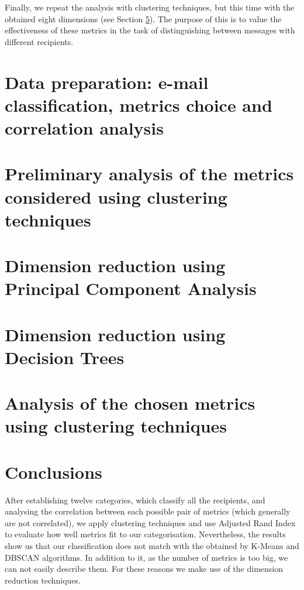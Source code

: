Finally, we repeat the analysis with clustering techniques, but this time with the obtained eight dimensions (see Section \ref{sect:clust2}). The purpose of this is to value the effectiveness of these metrics in the task of distinguishing between messages with different recipients.

\section{Data preparation: e-mail classification, metrics choice and correlation analysis}\label{sect:DatPrep}


\section{Preliminary analysis of the metrics considered using clustering techniques}\label{sect:clust1}


\section{Dimension reduction using Principal Component Analysis}\label{sect:pca}


\section{Dimension reduction using Decision Trees}\label{sect:dectrees}


\section{Analysis of the chosen metrics using clustering techniques}\label{sect:clust2}


\section{Conclusions}
After establishing twelve categories, which classify all the recipients, and analysing the correlation between each possible pair of metrics (which generally are not correlated), we apply clustering techniques and use Adjusted Rand Index to evaluate how well metrics fit to our categorisation. Nevertheless, the results show us that our classification does not match with the obtained by K-Means and DBSCAN algorithms. In addition to it, as the number of metrics is too big, we can not easily describe them. For these reasons we make use of the dimension reduction techniques.

